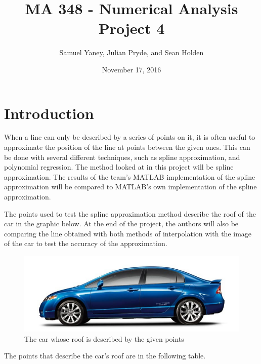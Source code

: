 \documentclass[12pt, letterpaper]{article} %
\begin{document}
\title{MA 348 - Numerical Analysis \\ Project 4}
\author{Samuel Yaney, Julian Pryde, and Sean Holden}
\date{November 17, 2016}
\maketitle

\section{Introduction}

When a line can only be described by a series of points on it, it is often useful to approximate the position of the line at points between the given ones. This can be done with several different techniques, such as spline approximation, and polynomial regression. The method looked at in this project will be spline approximation. The results of the team's MATLAB implementation of the spline approximation will be compared to MATLAB's own implementation of the spline approximation.

The points used to test the spline approximation method describe the roof of the car in the graphic below. At the end of the project, the authors will also be comparing the line obtained with both methods of interpolation with the image of the car to test the accuracy of the approximation.

\begin{center}
	\begin{figure}
		\includegraphics[scale=0.5]{Car.png}
		\caption{The car whose roof is described by the given points}
	\end{figure}
\end{center}

The points that describe the car's roof are in the following table.
\end{document}
